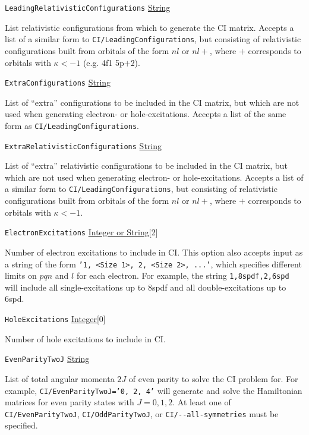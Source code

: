 \documentclass{report}
\begin{document}
\texttt{LeadingRelativisticConfigurations} \uline{String}
\begin{adjustwidth}{1cm}{}
List relativistic configurations from which to generate the CI matrix. Accepts a list of a similar form 
to \texttt{CI/LeadingConfigurations}, but consisting of relativistic configurations built from orbitals 
of the form $nl$ or $nl+$, where $+$ corresponds to orbitals with $\kappa < -1$ (e.g. 4f1 5p$+$2).
\end{adjustwidth}


\texttt{ExtraConfigurations} \uline{String}
\begin{adjustwidth}{1cm}{}
List of ``extra'' configurations to be included in the CI matrix, but which are not used when generating
electron- or hole-excitations. Accepts a list of the same form as \texttt{CI/LeadingConfigurations}.
\end{adjustwidth}

\texttt{ExtraRelativisticConfigurations} \uline{String}
\begin{adjustwidth}{1cm}{}
List of ``extra'' relativistic configurations to be included in the CI matrix, but which are not used 
when generating electron- or hole-excitations. Accepts a list of a similar form to
\texttt{CI/LeadingConfigurations}, but consisting of relativistic configurations built from orbitals of
the form $nl$ or $nl+$, where $+$ corresponds to orbitals with $\kappa < -1$.
\end{adjustwidth}

\texttt{ElectronExcitations} \uline{Integer or String}[2]
\begin{adjustwidth}{1cm}{}
Number of electron excitations to include in CI. 
This option also accepts input as a string of the form \texttt{'1, <Size 1>, 2, <Size 2>, ...'},
which specifies different limits on $pqn$ and $l$ for each electron. For example, the string
\texttt{1,8spdf,2,6spd} will include all single-excitations up to 8spdf and all double-excitations up to 
6spd.
\end{adjustwidth}

\texttt{HoleExcitations} \uline{Integer}[0]
\begin{adjustwidth}{1cm}{}
Number of hole excitations to include in CI.
\end{adjustwidth}

\texttt{EvenParityTwoJ} \uline{String}
\begin{adjustwidth}{1cm}{}
List of total angular momenta $2J$ of even parity to solve the CI problem for.
For example, \texttt{CI/EvenParityTwoJ='0, 2, 4'} will generate and solve the Hamiltonian matrices for
even parity states with $J = 0, 1, 2$. At least one of \texttt{CI/EvenParityTwoJ}, 
\texttt{CI/OddParityTwoJ}, or \texttt{CI/{-}{-}all-symmetries} must be specified.
\end{adjustwidth}
\end{document}

